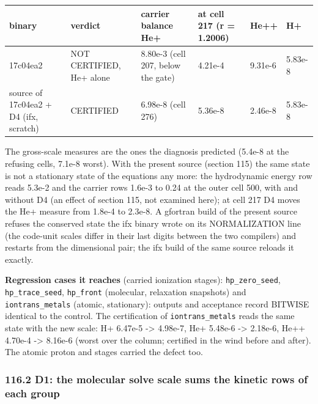 \documentclass[english,a4paper]{my_memo}
\begin{document}
{\def\LTcaptype{none} %
{\small
\begin{longtable}[]{@{}>{\raggedright\arraybackslash}p{\dimexpr(\linewidth-12\tabcolsep)/6\relax}>{\raggedright\arraybackslash}p{\dimexpr(\linewidth-12\tabcolsep)/6\relax}>{\raggedright\arraybackslash}p{\dimexpr(\linewidth-12\tabcolsep)/6\relax}>{\raggedright\arraybackslash}p{\dimexpr(\linewidth-12\tabcolsep)/6\relax}>{\raggedright\arraybackslash}p{\dimexpr(\linewidth-12\tabcolsep)/6\relax}>{\raggedright\arraybackslash}p{\dimexpr(\linewidth-12\tabcolsep)/6\relax}@{}}
\toprule\noalign{}
binary & verdict & carrier balance He+ & at cell 217 (r = 1.2006) & He++ & H+ \\
\midrule\noalign{}
\endhead
\bottomrule\noalign{}
\endlastfoot
17c04ea2 & NOT CERTIFIED, He+ alone & 8.80e-3 (cell 207, below the gate) & 4.21e-4 & 9.31e-6 & 5.83e-8 \\
source of 17c04ea2 + D4 (ifx, scratch) & CERTIFIED & 6.98e-8 (cell 276) & 5.36e-8 & 2.46e-8 & 5.83e-8 \\
\end{longtable}
}
}

The gross-scale measures are the ones the diagnosis predicted (5.4e-8 at the
refusing cells, 7.1e-8 worst). With the present source (section 115) the
same state is not a stationary state of the equations any more: the
hydrodynamic energy row reads 5.3e-2 and the carrier rows 1.6e-3 to 0.24 at
the outer cell 500, with and without D4 (an effect of section 115, not
examined here); at cell 217 D4 moves the He+ measure from 1.8e-4 to 2.3e-8.
A gfortran build of the present source refuses the conserved state the ifx
binary wrote on its NORMALIZATION line (the code-unit scales differ in their
last digits between the two compilers) and restarts from the dimensional
pair; the ifx build of the same source reloads it exactly.

\textbf{Regression cases it reaches} (carried ionization stages): \texttt{hp\_zero\_seed},
\texttt{hp\_trace\_seed}, \texttt{hp\_front} (molecular, relaxation snapshots) and
\texttt{iontrans\_metals} (atomic, stationary): outputs and acceptance record
BITWISE identical to the control. The certification of \texttt{iontrans\_metals}
reads the same state with the new scale: H+ 6.47e-5 -\textgreater{} 4.98e-7, He+
5.48e-6 -\textgreater{} 2.18e-6, He++ 4.70e-4 -\textgreater{} 8.16e-6 (worst over the column; certified
in the wind before and after). The atomic proton and stages carried the
defect too.

\subsubsection{116.2 D1: the molecular solve scale sums the kinetic rows of each group}\label{1162-d1-the-molecular-solve-scale-sums-the-kinetic-rows-of-each-group}
\end{document}
